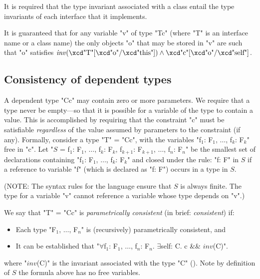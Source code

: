It is required that the
type invariant associated with a class entail the type invariants of
each interface that it implements.

It is guaranteed that for any variable \xcd"v" of
type \xcd"T{c}" (where \xcd"T" is an interface name or a class name) the only
objects \xcd"o" that may be stored in \xcd"v" are such that \xcd"o" satisfies
$\mathit{inv}(\mbox{\xcd"T"}[\mbox{\xcd"o"}/\mbox{\xcd"this"}])
\wedge \mbox{\xcd"c"}[\mbox{\xcd"o"}/\mbox{\xcd"self"}]$.

\subsection{Consistency of dependent types}\label{DepType:Consistency}

A dependent type \xcd"C{c}" may contain zero or more parameters. We require
that a type never be empty---so that it is possible for a variable of
the type to contain a value. This is accomplished by requiring that
the constraint \xcd"c" must be satisfiable {\em regardless} of the value assumed
by parameters to the constraint (if any). Formally, consider a type
\xcd"T" = \xcd"C{c}", with the variables
\xcdmath"f$_1$: F$_1$, $\dots$, f$_k$: F$_k$"
free in \xcd"c".  Let 
\xcdmath"$S$ = {f$_1$: F$_1$, $\dots$, f$_k$: F$_k$, f$_{k+1}$: F$_{k+1}$, $\dots$, f$_n$: F$_n$}"
be the smallest set of
declarations containing
\xcdmath"f$_1$: F$_1$, $\dots$, f$_k$: F$_k$"
and closed under the rule:
\xcd"f: F" in $S$ if a reference to variable \xcd"f" (which
is declared as \xcd"f: F") occurs in a type in $S$.

(NOTE: The syntax rules for the language ensure that $S$ is always
finite. The type for a variable \xcd"v" cannot reference a variable whose
type depends on \xcd"v".)

We say that \xcd"T" = \xcd"C{c}" is {\em parametrically consistent} (in brief:
{\em consistent}) if:

\begin{itemize}
\item Each type \xcdmath"F$_1$, $\dots$, F$_n$" is (recursively) parametrically consistent, and
\item It can be established that
\xcdmath"$\forall$f$_1$: F$_1$, $\dots$, f$_n$: F$_n$. $\exists$self: C. c && $\mathit{inv}$(C)".
\end{itemize}

\noindent
where \xcdmath"$\mathit{inv}$(C)" is the invariant associated
with the type \xcd"C" ().  Note by
definition of $S$ the formula above has no free variables.

